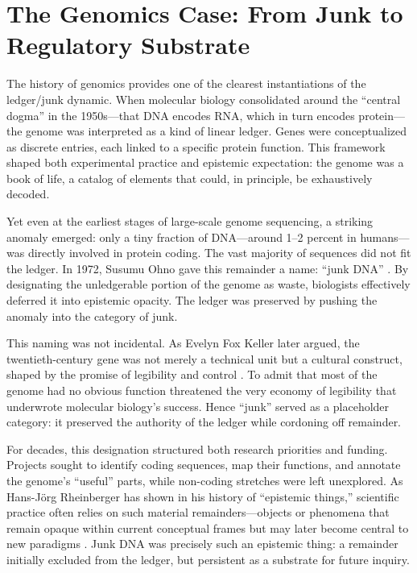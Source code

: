 \documentclass[12pt]{article}
\begin{document}
{{{\section{The Genomics Case: From Junk to Regulatory Substrate}

The history of genomics provides one of the clearest instantiations of the ledger/junk dynamic. When molecular biology consolidated around the ``central dogma'' in the 1950s---that DNA encodes RNA, which in turn encodes protein---the genome was interpreted as a kind of linear ledger. Genes were conceptualized as discrete entries, each linked to a specific protein function. This framework shaped both experimental practice and epistemic expectation: the genome was a book of life, a catalog of elements that could, in principle, be exhaustively decoded.

Yet even at the earliest stages of large-scale genome sequencing, a striking anomaly emerged: only a tiny fraction of DNA---around 1--2 percent in humans---was directly involved in protein coding. The vast majority of sequences did not fit the ledger. In 1972, Susumu Ohno gave this remainder a name: ``junk DNA'' \citep{ohno1972}. By designating the unledgerable portion of the genome as waste, biologists effectively deferred it into epistemic opacity. The ledger was preserved by pushing the anomaly into the category of junk.

This naming was not incidental. As Evelyn Fox Keller later argued, the twentieth-century gene was not merely a technical unit but a cultural construct, shaped by the promise of legibility and control \citep{keller2000}. To admit that most of the genome had no obvious function threatened the very economy of legibility that underwrote molecular biology’s success. Hence ``junk'' served as a placeholder category: it preserved the authority of the ledger while cordoning off remainder.

For decades, this designation structured both research priorities and funding. Projects sought to identify coding sequences, map their functions, and annotate the genome’s ``useful'' parts, while non-coding stretches were left unexplored. As Hans-Jörg Rheinberger has shown in his history of ``epistemic things,'' scientific practice often relies on such material remainders---objects or phenomena that remain opaque within current conceptual frames but may later become central to new paradigms \citep{rheinberger1997}. Junk DNA was precisely such an epistemic thing: a remainder initially excluded from the ledger, but persistent as a substrate for future inquiry.

}}}
\end{document}
